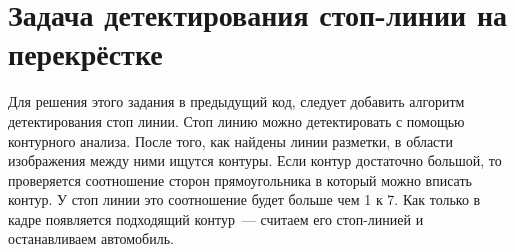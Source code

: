 \section{Задача детектирования стоп-линии на перекрёстке}

Для решения этого задания в предыдущий код, следует добавить алгоритм детектирования стоп линии. Стоп линию можно детектировать с помощью контурного анализа. После того, как найдены линии разметки, в области изображения между ними ищутся контуры. Если контур достаточно большой, то проверяется соотношение сторон прямоугольника в который можно вписать контур. У стоп линии это соотношение будет больше чем 1 к 7. Как только в кадре появляется подходящий контур~— считаем его стоп-линией и останавливаем автомобиль.

